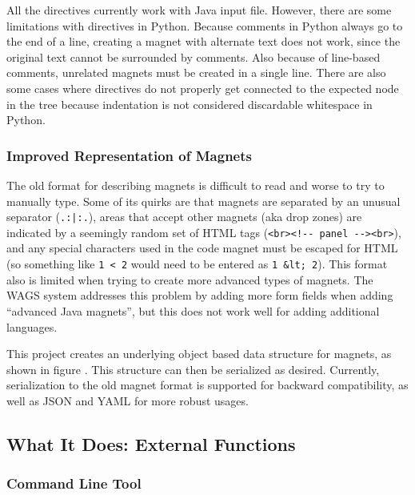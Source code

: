 \documentclass[letter,10pt]{article}
\begin{document}
All the directives currently work with Java input file. However, there 
are some limitations with directives in Python. Because comments in 
Python always go to the end of a line, creating a magnet with alternate 
text does not work, since the original text cannot be surrounded by 
comments. Also because of line-based comments, unrelated magnets must 
be created in a single line. There are also some cases where directives 
do not properly get connected to the expected node in the tree because 
indentation is not considered discardable whitespace in Python.

\subsubsection{Improved Representation of Magnets}

The old format for describing magnets is difficult to read and worse to 
try to manually type. Some of its quirks are that magnets are separated 
by an unusual separator (\verb~.:|:.~), areas that accept other magnets 
(aka drop zones) are indicated by a seemingly random set of HTML tags 
(\verb~<br><!-- panel --><br>~), and any special characters used in the 
code magnet must be escaped for HTML (so something like \verb~1 < 2~ 
would need to be entered as \verb~1 &lt; 2~). This format also is 
limited when trying to create more advanced types of magnets. The WAGS 
system addresses this problem by adding more form fields when adding 
``advanced Java magnets'', but this does not work well for adding 
additional languages.


This project creates an underlying object based data structure for 
magnets, as shown in figure . This 
structure can then be serialized as desired. Currently, serialization to 
the old magnet format is supported for backward compatibility, as well 
as JSON and YAML for more robust usages.



\subsection{What It Does: External Functions}

\subsubsection{Command Line Tool}
\end{document}
